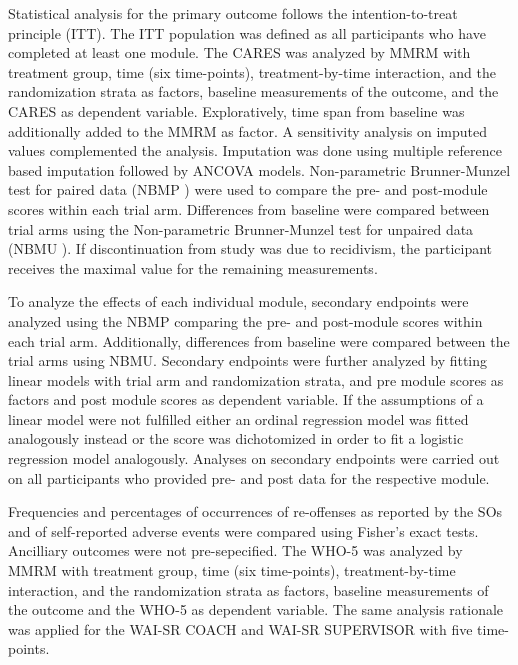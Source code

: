 \documentclass[
  super,
  preprint,
  1p,
  onecolumn]{elsarticle}
\begin{document}
Statistical analysis for the primary outcome follows the
intention-to-treat principle (ITT). The ITT population was defined as
all participants who have completed at least one module. The CARES was
analyzed by MMRM with treatment group, time (six time-points),
treatment-by-time interaction, and the randomization strata as factors,
baseline measurements of the outcome, and the CARES as dependent
variable. Exploratively, time span from baseline was additionally added
to the MMRM as factor. A sensitivity analysis on imputed values
complemented the analysis. Imputation was done using multiple reference
based imputation followed by ANCOVA models.
\citep{wolbersStandardReferencebasedConditional2022} Non-parametric
Brunner-Munzel test for paired data (NBMP
\citep{brunnerNonparametricBehrensFisherProblem2000}) were used to
compare the pre- and post-module scores within each trial arm.
Differences from baseline were compared between trial arms using the
Non-parametric Brunner-Munzel test for unpaired data (NBMU
\citep{brunnerNonparametricBehrensFisherProblem2000}). If
discontinuation from study was due to recidivism, the participant
receives the maximal value for the remaining measurements.

To analyze the effects of each individual module, secondary endpoints
were analyzed using the NBMP comparing the pre- and post-module scores
within each trial arm. Additionally, differences from baseline were
compared between the trial arms using NBMU. Secondary endpoints were
further analyzed by fitting linear models with trial arm and
randomization strata, and pre module scores as factors and post module
scores as dependent variable. If the assumptions of a linear model were
not fulfilled either an ordinal regression model was fitted analogously
instead or the score was dichotomized in order to fit a logistic
regression model analogously. Analyses on secondary endpoints were
carried out on all participants who provided pre- and post data for the
respective module.

Frequencies and percentages of occurrences of re-offenses as reported by
the SOs and of self-reported adverse events were compared using Fisher's
exact tests. Ancilliary outcomes were not pre-sepecified. The WHO-5 was
analyzed by MMRM with treatment group, time (six time-points),
treatment-by-time interaction, and the randomization strata as factors,
baseline measurements of the outcome and the WHO-5 as dependent
variable. The same analysis rationale was applied for the WAI-SR COACH
and WAI-SR SUPERVISOR with five time-points.
\end{document}
